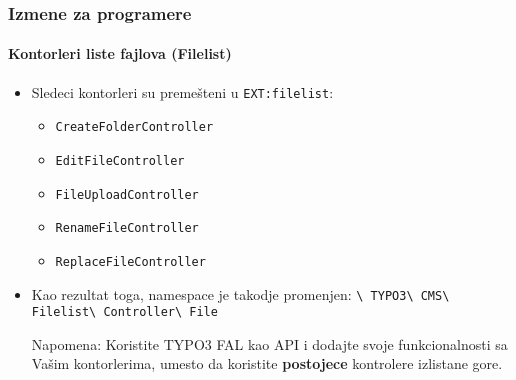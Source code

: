 
\begin{frame}[fragile]
	\frametitle{Izmene za programere}
	\framesubtitle{Kontorleri liste fajlova (Filelist)}

	\begin{itemize}
		\item Sledeci kontorleri su premešteni u \texttt{EXT:filelist}:

			\begin{itemize}\small
				\item \texttt{CreateFolderController}
				\item \texttt{EditFileController}
				\item \texttt{FileUploadController}
				\item \texttt{RenameFileController}
				\item \texttt{ReplaceFileController}
			\end{itemize}\normalsize

		\item Kao rezultat toga, namespace je takodje promenjen:\newline
			\texttt{\textbackslash
				TYPO3\textbackslash
				CMS\textbackslash
				Filelist\textbackslash
				Controller\textbackslash
				File}

		\vspace{0.2cm}

		\small
			Napomena: Koristite TYPO3 FAL kao API i dodajte svoje funkcionalnosti
			sa Vašim kontorlerima, umesto da koristite \textbf{postojece}
			kontrolere izlistane gore.
		\normalsize

	\end{itemize}

\end{frame}


